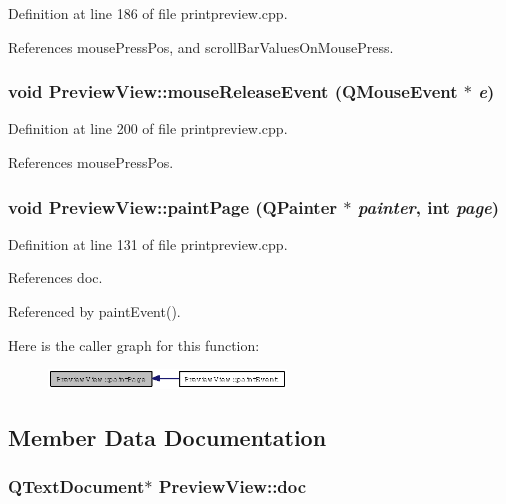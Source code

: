 Definition at line 186 of file printpreview.cpp.

References mouse\-Press\-Pos, and scroll\-Bar\-Values\-On\-Mouse\-Press.
\subsubsection{\setlength{\rightskip}{0pt plus 5cm}void Preview\-View::mouse\-Release\-Event (QMouse\-Event $\ast$ {\em e})\hspace{0.3cm}{\tt  [protected, virtual]}}\label{classPreviewView_1c978917c8a5502bb17049776705ef19}




Definition at line 200 of file printpreview.cpp.

References mouse\-Press\-Pos.
\subsubsection{\setlength{\rightskip}{0pt plus 5cm}void Preview\-View::paint\-Page (QPainter $\ast$ {\em painter}, int {\em page})\hspace{0.3cm}{\tt  [private]}}\label{classPreviewView_d4b754ec37ab649c2d545d5a980146f4}




Definition at line 131 of file printpreview.cpp.

References doc.

Referenced by paint\-Event().

Here is the caller graph for this function:\begin{figure}[H]
\begin{center}
\leavevmode
\includegraphics[width=179pt]{classPreviewView_d4b754ec37ab649c2d545d5a980146f4_icgraph}
\end{center}
\end{figure}


\subsection{Member Data Documentation}
\subsubsection{\setlength{\rightskip}{0pt plus 5cm}QText\-Document$\ast$ {\bf Preview\-View::doc}\hspace{0.3cm}{\tt  [private]}}\label{classPreviewView_33c99695172958856ff84b080b2023d4}




